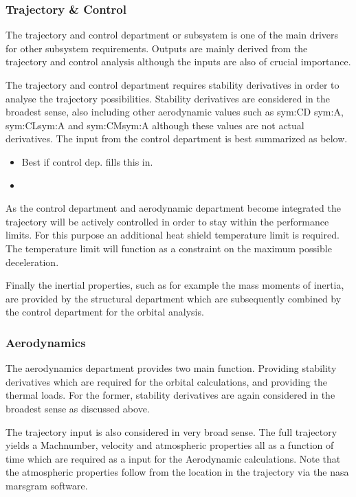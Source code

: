 \subsubsection{Trajectory \& Control}

The trajectory and control department or subsystem is one of the main drivers for other subsystem requirements. Outputs are mainly derived from the trajectory and control analysis although the inputs are also of crucial importance. 

The trajectory and control department requires stability derivatives in order to analyse the trajectory possibilities. Stability derivatives are considered in the broadest sense, also including other aerodynamic values such as \gls{sym:CD} \gls{sym:A}, \gls{sym:CL}\gls{sym:A} and \gls{sym:CM}\gls{sym:A} although these values are not actual derivatives. The input from the control department is best summarized as below.

\begin{itemize}
\item Best if control dep. fills this in.
\item 
\end{itemize}

As the control department and aerodynamic department become integrated the trajectory will be actively controlled in order to stay within the performance limits. For this purpose an additional heat shield temperature limit is required. The temperature limit will function as a constraint on the maximum possible deceleration.

Finally the inertial properties, such as for example the mass moments of inertia, are provided by the structural department which are subsequently combined by the control department for the orbital analysis.

\subsubsection{Aerodynamics}
The aerodynamics department provides two main function. Providing stability derivatives which are required for the orbital calculations, and providing the thermal loads. 
For the former, stability derivatives are again considered in the broadest sense as discussed above. 

The trajectory input is also considered in very broad sense. The full trajectory yields a Machnumber, velocity and atmospheric properties all as a function of time which are required as a input for the Aerodynamic calculations. Note that the atmospheric properties follow from the location in the trajectory via the \gls{nasa} \gls{marsgram} software\cite{Justus2001}.

